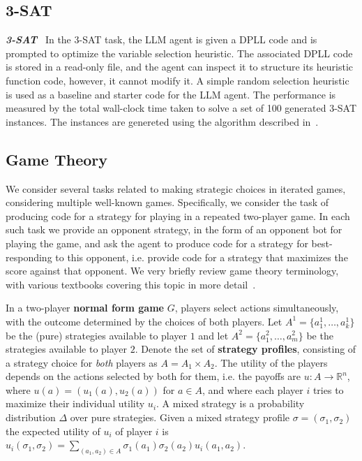 \documentclass[]{fairmeta}
\newcommand{\ibold}[1]{\textbf{\textit{#1}}}
\begin{document}
\subsection{3-SAT}

\ibold{3-SAT}~\citep{cook1971complexity} In the 3-SAT task, the LLM agent is given a DPLL code and is prompted to optimize the variable selection heuristic.
%
The associated DPLL code is stored in a read-only file, and the agent can inspect it to structure its heuristic function code, however, it cannot modify it.
%
A simple random selection heuristic is used as a baseline and starter code for the LLM agent.
%
The performance is measured by the total wall-clock time taken to solve a set of 100 generated 3-SAT instances. The instances are genereted using the algorithm described in~\citet{selsam2018satAlgorithm}.


\subsection{Game Theory}

We consider several tasks related to making strategic choices in iterated games, considering multiple well-known games.
Specifically, we consider the task of producing code for a strategy for playing in a repeated two-player game.
In each such task we provide an opponent strategy, in the form of an opponent bot for playing the game, and ask the agent to produce code for a strategy for best-responding to this opponent, i.e. provide code for a strategy that maximizes the score against that opponent.
We very briefly review game theory terminology, with various textbooks covering this topic in more detail~\citep{fudenberg1991game}.

In a two-player {\bf normal form game} $G$, players select actions simultaneously, with the outcome determined by the choices of both players.
Let $A^1 = \{ a^1_1, \ldots, a^1_k \}$ be the (pure) strategies available to player $1$ and let $A^2 = \{ a^2_1, \ldots, a^2_m \}$ be the strategies available to player $2$.
Denote the set of {\bf strategy profiles}, consisting of a strategy choice for {\it both} players as $A = A_1 \times A_2$.
The utility of the players depends on the actions selected by both for them, i.e. the payoffs are $u: A \rightarrow \mathbb{R}^n$,  where $u(a) = (u_1(a), u_2(a))$ for $a \in A$, and where each player $i$ tries to maximize their individual utility $u_i$.
A mixed strategy is a probability distribution $\Delta$ over pure strategies.
Given a mixed strategy profile $\sigma = (\sigma_1,\sigma_2)$ the expected utility of $u_i$ of player $i$ is 
$    u_i(\sigma_1, \sigma_2) = \sum_{(a_1, a_2) \in A} \sigma_1(a_1) \sigma_2(a_2) u_i(a_1, a_2)$. 
\end{document}
